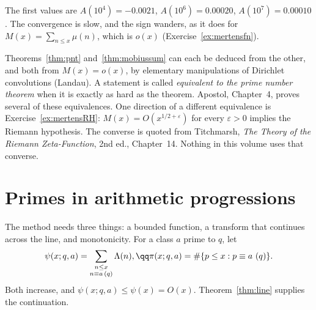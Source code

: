The first values are $A(10^4)=-0.0021$, $A(10^6)=0.00020$, $A(10^7)=0.00010$. The convergence is slow, and the sign wanders, as it does for $M(x)=\sum_{n\le x}\mu(n)$, which is $o(x)$ (Exercise~\ref{ex:mertensfn}).

\begin{remark}
Theorems~\ref{thm:pnt} and~\ref{thm:mobiussum} can each be deduced from the other, and both from $M(x)=o(x)$, by elementary manipulations of Dirichlet convolutions (Landau). A statement is called \emph{equivalent to the prime number theorem} when it is exactly as hard as the theorem. Apostol, Chapter~4, proves several of these equivalences. One direction of a different equivalence is Exercise~\ref{ex:mertensRH}: $M(x)=O(x^{1/2+\varepsilon})$ for every $\varepsilon>0$ implies the Riemann hypothesis. The converse is quoted from Titchmarsh, \emph{The Theory of the Riemann Zeta-Function}, 2nd ed., Chapter~14. Nothing in this volume uses that converse.
\end{remark}

\section{Primes in arithmetic progressions}

The method needs three things: a bounded function, a transform that continues across the line, and monotonicity. For a class $a$ prime to $q$, let
\[
\begin{gathered}\psi(x;q,a)=\sum_{\substack{n\le x\\n\equiv a\,(q)}}\Lambda(n),\qq\pi(x;q,a)=\#\{p\le x:p\equiv a\ (q)\}.\end{gathered}
\]
Both increase, and $\psi(x;q,a)\le\psi(x)=O(x)$. Theorem~\ref{thm:line} supplies the continuation.

